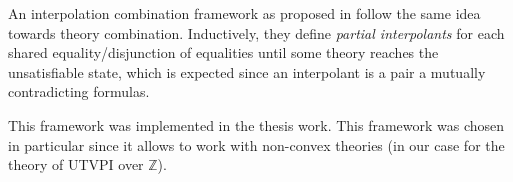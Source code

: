 An interpolation combination framework as proposed in \cite{10.1007/11532231_26}
follow the same idea towards theory combination. Inductively, they define
\emph{partial interpolants} for each shared equality/disjunction of equalities
until some theory reaches the unsatisfiable state, which is expected since 
an interpolant is a pair a mutually contradicting formulas.

This framework was implemented in the thesis work. This framework was chosen
in particular since it allows to work with non-convex theories (in our case
for the theory of UTVPI over $\mathbb{Z}$).

